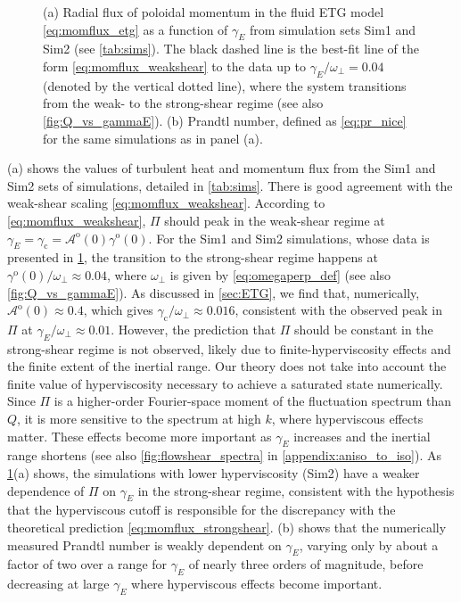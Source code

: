 \documentclass{jpp}
\newcommand{\gammaoO}{\gamma^\text{o}(0)}
\newcommand{\gammaani}{\gamma_{\text{c}}}
\newcommand{\gammaE}{\gamma_{E}}
\newcommand{\A}{\mathcal{A}}
\newcommand{\AoO}{\A^\text{o}(0)}
\begin{document}
\begin{figure}
	\centering
	\caption{(a) Radial flux of poloidal momentum in the fluid ETG model \cref{eq:momflux_etg} as a function of \(\gammaE\) from simulation sets Sim1 and Sim2 (see \cref{tab:sims}). The black dashed line is the best-fit line of the form \cref{eq:momflux_weakshear} to the data up to \(\gammaE/\omega_\perp = 0.04\) (denoted by the vertical dotted line), where the system transitions from the weak- to the strong-shear regime (see also \cref{fig:Q_vs_gammaE}). (b) Prandtl number, defined as \cref{eq:pr_nice} for the same simulations as in panel (a).}
	\label{fig:momflux_pr}
\end{figure}

(a) shows the values of turbulent heat and momentum flux from the Sim1 and Sim2 sets of simulations, detailed in \cref{tab:sims}. There is good agreement with the weak-shear scaling \cref{eq:momflux_weakshear}. According to \cref{eq:momflux_weakshear}, \(\Pi\) should peak in the weak-shear regime at \(\gammaE = \gammaani = \AoO\gammaoO\). For the Sim1 and Sim2 simulations, whose data is presented in \cref{fig:momflux_pr}, the transition to the strong-shear regime happens at \(\gammaoO/\omega_\perp \approx 0.04\), where \(\omega_\perp\) is given by \cref{eq:omegaperp_def} (see also \cref{fig:Q_vs_gammaE}). As discussed in \cref{sec:ETG}, we find that, numerically, \(\AoO \approx 0.4\), which gives \(\gammaani/\omega_\perp \approx 0.016 \), consistent with the observed peak in \(\Pi\) at \(\gammaE/\omega_\perp \approx 0.01\). However, the prediction that \(\Pi\) should be constant in the strong-shear regime is not observed, likely due to finite-hyperviscosity effects and the finite extent of the inertial range. Our theory does not take into account the finite value of hyperviscosity necessary to achieve a saturated state numerically. Since \(\Pi\) is a higher-order Fourier-space moment of the fluctuation spectrum than \(Q\), it is more sensitive to the spectrum at high \(k\), where hyperviscous effects matter. These effects become more important as \(\gammaE\) increases and the inertial range shortens (see also \cref{fig:flowshear_spectra} in \cref{appendix:aniso_to_iso}). As \cref{fig:momflux_pr}(a) shows, the simulations with lower hyperviscosity (Sim2) have a weaker dependence of \(\Pi\) on \(\gammaE\) in the strong-shear regime, consistent with the hypothesis that the hyperviscous cutoff is responsible for the discrepancy with the theoretical prediction \cref{eq:momflux_strongshear}. (b) shows that the numerically measured Prandtl number is weakly dependent on \(\gammaE\), varying only by about a factor of two over a range for \(\gammaE\) of nearly three orders of magnitude, before decreasing at large \(\gammaE\) where hyperviscous effects become important.
\end{document}
